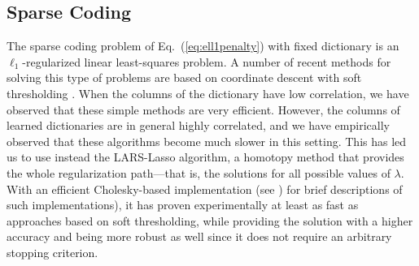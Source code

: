 \documentclass[twoside,11pt]{article}
\begin{document}
\subsection{Sparse Coding} \label{sec:sparsecoding}
The sparse coding problem of Eq.~(\ref{eq:ell1penalty}) with fixed dictionary
is an $\ell_1$-regularized linear least-squares problem.  A number of recent
methods for solving this type of problems are based on coordinate descent with
soft thresholding \citep{fu,friedman,wu}.  When the columns of the dictionary
have low correlation, we have observed that these simple methods are very efficient.
However, the columns of learned dictionaries are in general highly correlated,
and we have empirically observed that these 
algorithms become much slower in this setting.  This has led us to
use instead the LARS-Lasso algorithm, a homotopy method
\citep{osborne2,efron} that provides the whole regularization
path---that is, the solutions for all possible values of
$\lambda$. With an efficient Cholesky-based implementation
(see \citealp{efron,zou}) for brief descriptions of such implementations), it has
proven experimentally at least as fast as approaches based on soft
thresholding, while providing the solution with a higher accuracy and
being more robust as well since it does not require an arbitrary stopping criterion.
\end{document}
